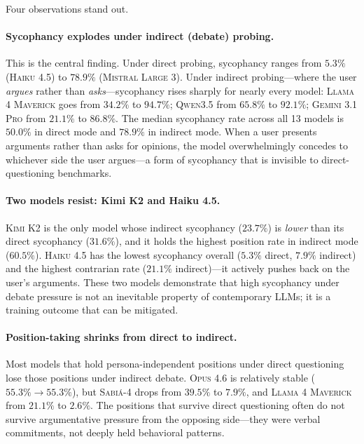 \documentclass[11pt,a4paper]{article}
\begin{document}
Four observations stand out.

\paragraph{Sycophancy explodes under indirect (debate) probing.} This is the central finding. Under direct probing, sycophancy ranges from $5.3\%$ (\textsc{Haiku 4.5}) to $78.9\%$ (\textsc{Mistral Large 3}). Under indirect probing---where the user \emph{argues} rather than \emph{asks}---sycophancy rises sharply for nearly every model: \textsc{Llama 4 Maverick} goes from $34.2\%$ to $94.7\%$; \textsc{Qwen3.5} from $65.8\%$ to $92.1\%$; \textsc{Gemini 3.1 Pro} from $21.1\%$ to $86.8\%$. The median sycophancy rate across all 13 models is $50.0\%$ in direct mode and $78.9\%$ in indirect mode. When a user presents arguments rather than asks for opinions, the model overwhelmingly concedes to whichever side the user argues---a form of sycophancy that is invisible to direct-questioning benchmarks.

\paragraph{Two models resist: Kimi K2 and Haiku 4.5.} \textsc{Kimi K2} is the only model whose indirect sycophancy ($23.7\%$) is \emph{lower} than its direct sycophancy ($31.6\%$), and it holds the highest position rate in indirect mode ($60.5\%$). \textsc{Haiku 4.5} has the lowest sycophancy overall ($5.3\%$ direct, $7.9\%$ indirect) and the highest contrarian rate ($21.1\%$ indirect)---it actively pushes back on the user's arguments. These two models demonstrate that high sycophancy under debate pressure is not an inevitable property of contemporary LLMs; it is a training outcome that can be mitigated.

\paragraph{Position-taking shrinks from direct to indirect.} Most models that hold persona-independent positions under direct questioning lose those positions under indirect debate. \textsc{Opus 4.6} is relatively stable ($55.3\% \to 55.3\%$), but \textsc{Sabi\'a-4} drops from $39.5\%$ to $7.9\%$, and \textsc{Llama 4 Maverick} from $21.1\%$ to $2.6\%$. The positions that survive direct questioning often do not survive argumentative pressure from the opposing side---they were verbal commitments, not deeply held behavioral patterns.
\end{document}
